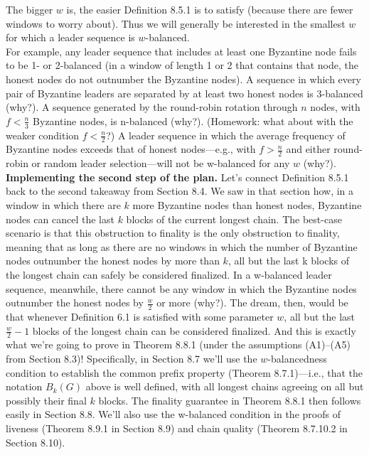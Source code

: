 The bigger $w$ is, the easier Definition 8.5.1 is to satisfy (because there are fewer windows to
worry about). Thus we will generally be interested in the smallest $w$ for which a leader
sequence is $w$-balanced.\\
For example, any leader sequence that includes at least one Byzantine node fails to be
1- or 2-balanced (in a window of length 1 or 2 that contains that node, the honest nodes do
not outnumber the Byzantine nodes). A sequence in which every pair of Byzantine leaders
are separated by at least two honest nodes is 3-balanced (why?). A sequence generated by
the round-robin rotation through $n$ nodes, with $f < \frac{n}{3}$ Byzantine nodes, is n-balanced
(why?). (Homework: what about with the weaker condition $f < \frac{n}{2}$?) A leader sequence
in which the average frequency of Byzantine nodes exceeds that of honest nodes—e.g., with
$f > \frac{n}{2}$ and either round-robin or random leader selection—will not be w-balanced for
any $w$ (why?).\\

\noindent
\textbf{Implementing the second step of the plan.} Let’s connect Definition 8.5.1 back to the
second takeaway from Section 8.4. We saw in that section how, in a window in which there
are $k$ more Byzantine nodes than honest nodes, Byzantine nodes can cancel the last $k$ blocks
of the current longest chain. The best-case scenario is that this obstruction to finality is
the only obstruction to finality, meaning that as long as there are no windows in which the
number of Byzantine nodes outnumber the honest nodes by more than $k$, all but the last k
blocks of the longest chain can safely be considered finalized.
In a w-balanced leader sequence, meanwhile, there cannot be any window in which the
Byzantine nodes outnumber the honest nodes by $\frac{w}{2}$ or more (why?). The dream, then,
would be that whenever Definition 6.1 is satisfied with some parameter $w$, all but the last
$\frac{w}{2} - 1$ blocks of the longest chain can be considered finalized. And this is exactly what we’re going to prove in Theorem 8.8.1 (under the assumptions (A1)–(A5) from Section 8.3)!
Specifically, in Section 8.7 we’ll use the $w$-balancedness condition to establish the common
prefix property (Theorem 8.7.1)—i.e., that the notation $B_k(G)$ above is well defined, with all
longest chains agreeing on all but possibly their final $k$ blocks. The finality guarantee
in Theorem 8.8.1 then follows easily in Section 8.8. We’ll also use the w-balanced condition
in the proofs of liveness (Theorem 8.9.1 in Section 8.9) and chain quality (Theorem 8.7.10.2 in
Section 8.10).\\

